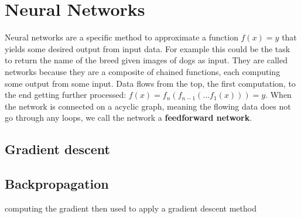 \section{Neural Networks}
\label{sec:concepts:nn}
Neural networks are a specific method to approximate a function $f(x) = y$ that yields some desired output from input data. For example this could be the task to return the name of the breed given images of dogs as input. They are called networks because they are a composite of chained functions, each computing some output from some input. Data flows from the top, the first computation, to the end getting further processed: $f(x) = f_n(f_{n-1}(\dots f_1(x))) = y$. When the network is connected on a acyclic graph, meaning the flowing data does not go through any loops, we call the network a \textbf{feedforward network}.

\subsection{Gradient descent}
\label{sub:concepts:nn:gd}

\subsection{Backpropagation}
\label{sub:concepts:nn:backprob}
\citet{rumelhart_learning_1988}
computing the gradient then used to apply a gradient descent method

